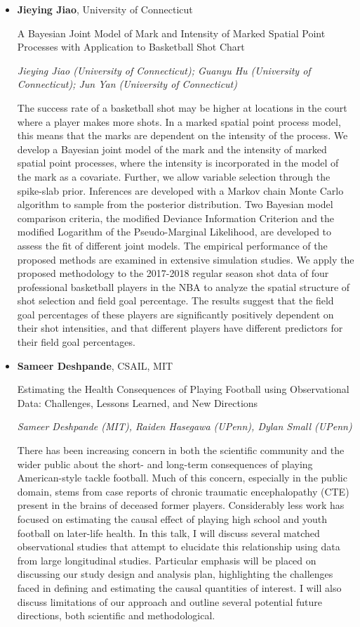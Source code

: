\begin{itemize}
\item \textbf{Jieying Jiao}, University of Connecticut

A Bayesian Joint Model of Mark and Intensity of Marked   Spatial Point Processes with Application to Basketball Shot Chart

\emph{\footnotesize Jieying Jiao (University of Connecticut); Guanyu Hu (University of Connecticut); Jun Yan (University of Connecticut)}

The success rate of a basketball shot may be higher at locations in the court where a player makes more shots. In a marked spatial point process model, this means that the marks are dependent on the intensity of the process. We develop a Bayesian joint model of the mark and the intensity of marked spatial point processes, where the intensity is incorporated in the model of the mark as a covariate. Further, we allow variable selection through the spike-slab prior. Inferences are developed with a Markov chain Monte Carlo algorithm to sample from the posterior distribution. Two Bayesian model comparison criteria,  the modified Deviance Information Criterion and the modified Logarithm of the Pseudo-Marginal Likelihood, are developed to assess the fit of different joint models. The empirical performance of the proposed methods are examined in extensive simulation studies. We apply the proposed methodology to the 2017-2018 regular season shot data of four professional basketball players in the NBA to analyze the spatial structure of shot selection and field goal percentage. The results suggest that the field goal percentages of these players are significantly positively dependent on their shot intensities, and that different players have different predictors for their field goal percentages.

\item \textbf{Sameer Deshpande}, CSAIL, MIT

Estimating the Health Consequences of Playing Football using Observational Data: Challenges, Lessons Learned, and New Directions

\emph{\footnotesize Sameer Deshpande (MIT), Raiden Hasegawa (UPenn), Dylan Small (UPenn)}

There has been increasing concern in both the scientific community and the wider public about the short- and long-term consequences of playing American-style tackle football. Much of this concern, especially in the public domain, stems from case reports of chronic traumatic encephalopathy (CTE) present in the brains of deceased former players. Considerably less work has focused on estimating the causal effect of playing high school and youth football on later-life health. In this talk, I will discuss several matched observational studies that attempt to elucidate this relationship using data from large longitudinal studies. Particular emphasis will be placed on discussing our study design and analysis plan, highlighting the challenges faced in defining and estimating the causal quantities of interest. I will also discuss limitations of our approach and outline several potential future directions, both scientific and methodological.


\end{itemize}
